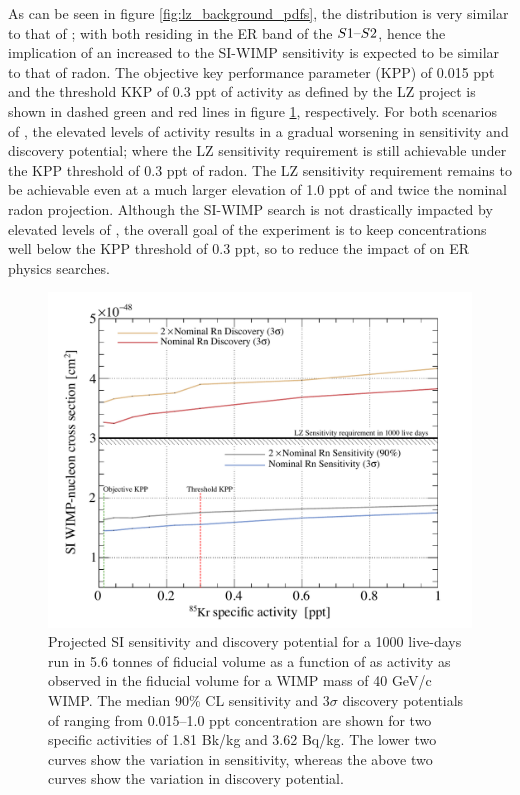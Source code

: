 {As can be seen in figure \ref{fig:lz_background_pdfs}, the \KrEF{} distribution is very similar to that of \RnTTT{}; with both residing in the ER band of the $S1\text{--}{}S2$, hence the implication of an increased \KrEF{} to the SI-WIMP sensitivity is expected to be similar to that of radon. The objective key performance parameter (KPP) of 0.015 ppt and the threshold KKP of 0.3 ppt of \KrEF{} activity as defined by the LZ project is shown in dashed green and red lines in figure \ref{fig:krypton_sensitivity_discovery}, respectively. For both scenarios of \RnTTT{}, the elevated levels of \KrEF{} activity results in a gradual worsening in sensitivity and discovery potential; where the LZ sensitivity requirement is still achievable under the KPP threshold of 0.3 ppt of radon. The LZ sensitivity requirement remains to be achievable even at a much larger elevation of 1.0 ppt of \KrEF{} and twice the nominal radon projection. Although the SI-WIMP search is not drastically impacted by elevated levels of \KrEF{}, the overall goal of the experiment is to keep \KrEF{} concentrations well below the KPP threshold of 0.3 ppt, so to reduce the impact of \KrEF{} on ER physics searches.

%
\begin{figure}[h!]
    \centering
    \includegraphics[scale=0.8]{Chapter_5/Figures/sensitivity_studies/lz_krypton_vs_sensitivity.pdf}
    \caption[Projected SI sensitivity and discovery potential for a 1000 live-days run in 5.6 tonnes of fiducial volume as a function of \KrEF{} as activity as observed in the fiducial volume for a WIMP mass of 40 GeV/c\squared{} WIMP.]%
    {Projected SI sensitivity and discovery potential for a 1000 live-days run in 5.6 tonnes of fiducial volume as a function of \KrEF{} as activity as observed in the fiducial volume for a WIMP mass of 40 GeV/c\squared{} WIMP. The median 90\% CL sensitivity and $3\sigma$ discovery potentials of \KrEF{} ranging from 0.015--1.0 ppt concentration are shown for two \RnTTT{} specific activities of 1.81 \micro{}Bk/kg and 3.62 \micro{}Bq/kg. The lower two curves show the variation in sensitivity, whereas the above two curves show the variation in discovery potential.}
    \label{fig:krypton_sensitivity_discovery}
\end{figure}
%


}
